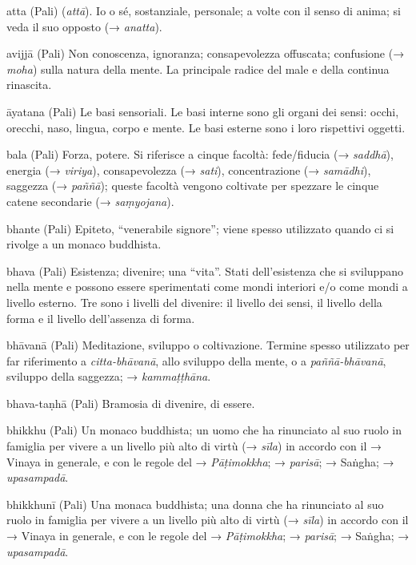 \begin{glossarydescription}
\item[atta] (Pali) (\emph{attā}). Io o sé, sostanziale, personale; a volte con
il senso di anima; si veda il suo opposto (→ \emph{anatta}).

\item[avijjā] (Pali) Non conoscenza, ignoranza; consapevolezza offuscata;
confusione (→ \emph{moha}) sulla natura della mente. La principale
radice del male e della continua rinascita.

\item[āyatana] (Pali) Le basi sensoriali. Le basi interne sono gli organi dei
sensi: occhi, orecchi, naso, lingua, corpo e mente. Le basi esterne sono
i loro rispettivi oggetti.


\item[bala] (Pali) Forza, potere. Si riferisce a cinque facoltà: fede/fiducia
(→ \emph{saddhā}), energia (→ \emph{viriya}), consapevolezza (→
\emph{sati}), concentrazione (→ \emph{samādhi}), saggezza (→
\emph{paññā}); queste facoltà vengono coltivate per spezzare le cinque
catene secondarie (→ \emph{saṃyojana}).

\item[bhante] (Pali) Epiteto, ``venerabile signore''; viene spesso utilizzato
quando ci si rivolge a un monaco buddhista.

\item[bhava] (Pali) Esistenza; divenire; una ``vita''. Stati dell'esistenza
che si sviluppano nella mente e possono essere sperimentati come mondi
interiori e/o come mondi a livello esterno. Tre sono i livelli del
divenire: il livello dei sensi, il livello della forma e il livello
dell'assenza di forma.

\item[bhāvanā] (Pali) Meditazione, sviluppo o coltivazione. Termine spesso
utilizzato per far riferimento a \emph{citta-bhāvanā}, allo sviluppo
della mente, o a \emph{paññā-bhāvanā}, sviluppo della saggezza; →
\emph{kammaṭṭhāna}.

\item[bhava-taṇhā] (Pali) Bramosia di divenire, di essere.

\item[bhikkhu] (Pali) Un monaco buddhista; un uomo che ha rinunciato al suo
ruolo in famiglia per vivere a un livello più alto di virtù (→
\emph{sīla}) in accordo con il → Vinaya in generale, e con le regole del
→ \emph{Pāṭimokkha}; → \emph{parisā}; → Saṅgha; → \emph{upasampadā}.

\item[bhikkhunī] (Pali) Una monaca buddhista; una donna che ha rinunciato al
suo ruolo in famiglia per vivere a un livello più alto di virtù (→
\emph{sīla}) in accordo con il → Vinaya in generale, e con le regole del
→ \emph{Pāṭimokkha}; → \emph{parisā}; → Saṅgha; → \emph{upasampadā}.


\end{glossarydescription}
